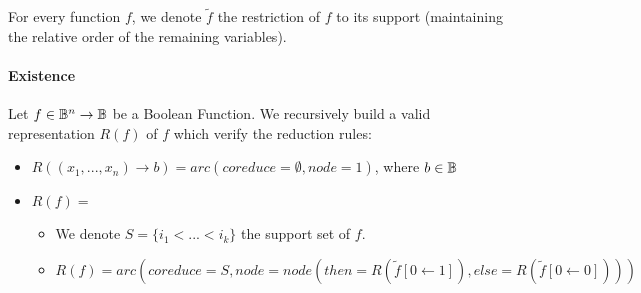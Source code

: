 \documentclass[a4paper,10pt]{article}
\begin{document}
For every function $f$, we denote $\tilde{f}$ the restriction of $f$ to its support (maintaining the relative order of the remaining variables).

\paragraph{Existence}
Let $f\in\mathbb{B}^n\rightarrow\mathbb{B}$ be a Boolean Function. We recursively build a valid representation $R(f)$ of $f$ which verify the reduction rules:\begin{itemize}
  \item $R((x_1, ..., x_n) \rightarrow b) = arc(coreduce = \emptyset, node = 1)$, where $b\in\mathbb{B}$
  \item $R(f) = $\begin{itemize}
    \item We denote $S=\{i_1 < ... < i_k\}$ the support set of $f$.
    \item $R(f) = arc(coreduce = S, node = node(then = R(\tilde{f}[0\leftarrow 1]), else = R(\tilde{f}[0\leftarrow 0])))$
  \end{itemize}
\end{itemize}
\end{document}

